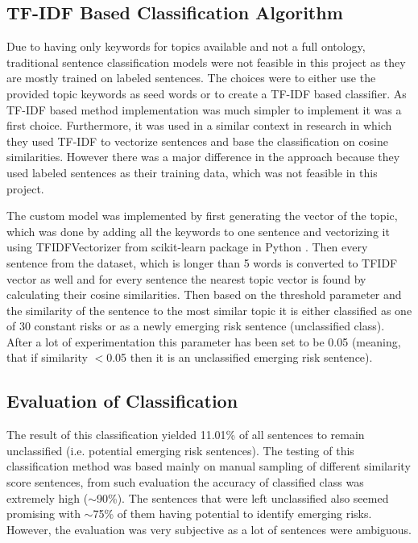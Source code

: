\subsection{TF-IDF Based Classification Algorithm}
Due to having only keywords for topics available and not a full ontology, traditional sentence classification models were not feasible in this project as they are mostly trained on labeled sentences. The choices were to either use the provided topic keywords as seed words or to create a TF-IDF based classifier. As TF-IDF based method implementation was much simpler to implement it was a first choice. Furthermore, it was used in a similar context in research in which they used TF-IDF to vectorize sentences and base the classification on cosine similarities\cite{tfidfclassificationresearch}. However there was a major difference in the approach because they used labeled sentences as their training data, which was not feasible in this project.

The custom model was implemented by first generating the vector of the topic, which was done by adding all the keywords to one sentence and vectorizing it using TFIDFVectorizer from scikit-learn package in Python \cite{sklearnhome}. Then every sentence from the dataset, which is longer than 5 words is converted to TFIDF vector as well and for every sentence the nearest topic vector is found by calculating their cosine similarities. Then based on the threshold parameter and the similarity of the sentence to the most similar topic it is either classified as one of 30 constant risks or as a newly emerging risk sentence (unclassified class). After a lot of experimentation this parameter has been set to be 0.05 (meaning, that if similarity $<$0.05 then it is an unclassified emerging risk sentence).

\subsection{Evaluation of Classification}
The result of this classification yielded 11.01\% of all sentences to remain unclassified (i.e. potential emerging risk sentences). The testing of this classification method was based mainly on manual sampling of different similarity score sentences, from such evaluation the accuracy of classified class was extremely high ($\sim$90\%). The sentences that were left unclassified also seemed promising with $\sim$75\% of them having potential to identify emerging risks. However, the evaluation was very subjective as a lot of sentences were ambiguous.

